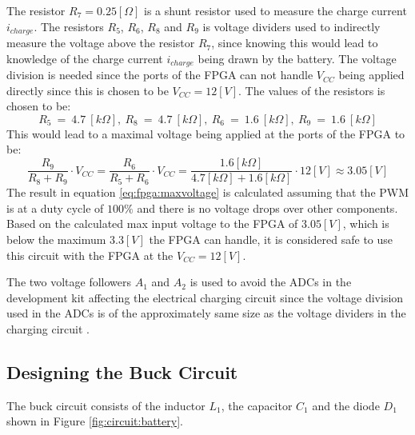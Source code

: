 \documentclass[../report.tex]{subfiles}
\begin{document}
The resistor $R_{7} = 0.25 [\Omega]$ is a shunt resistor used to measure the charge current $i_{charge}$. The resistors $R_5$, $R_6$, $R_8$ and $R_9$ is voltage dividers used to indirectly measure the voltage above the resistor $R_7$, since knowing this would lead to knowledge of the charge current $i_{charge}$ being drawn by the battery. The voltage division is needed since the ports of the FPGA can not handle $V_{CC}$ being applied directly since this is chosen to be $V_{CC} = 12 [V]$. The values of the resistors is chosen to be:
\begin{equation}
    R_5\ =\ 4.7\ [k\Omega],\ R_8\ =\ 4.7\ [k\Omega],\ R_6\ =\ 1.6\ [k\Omega],\ R_9\ =\ 1.6\ [k\Omega]
\end{equation}
This would lead to a maximal voltage being applied at the ports of the FPGA to be:
\begin{equation} \label{eq:fpga:maxvoltage}
     \frac{R_9}{R_8 + R_9} \cdot V_{CC}=\frac{R_6}{R_5 + R_6} \cdot V_{CC} = \frac{1.6 [k\Omega]}{4.7 [k\Omega] + 1.6 [k\Omega]}\cdot 12 [V] \approx 3.05 [V] 
\end{equation}
The result in equation \ref{eq:fpga:maxvoltage} is calculated assuming that the PWM is at a duty cycle of $100 \%$ and there is no voltage drops over other components. Based on the calculated max input voltage to the FPGA of $3.05 [V]$, which is below the maximum $3.3 [V]$ the FPGA can handle, it is considered safe to use this circuit with the FPGA at the $V_{CC} = 12 [V]$.

The two voltage followers $A_1$ and $A_2$ is used to avoid the ADCs in the development kit affecting the electrical charging circuit since the voltage division used in the ADCs is of the approximately same size as the voltage dividers in the charging circuit \cite{xadc_ref}.

\subsection{Designing the Buck Circuit}
The buck circuit consists of the inductor $L_1$, the capacitor $C_1$ and the diode $D_1$ shown in Figure \ref{fig:circuit:battery}.
\end{document}
